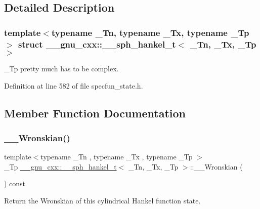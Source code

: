 \subsection{Detailed Description}
\subsubsection*{template$<$typename \+\_\+\+Tn, typename \+\_\+\+Tx, typename \+\_\+\+Tp$>$\newline
struct \+\_\+\+\_\+gnu\+\_\+cxx\+::\+\_\+\+\_\+sph\+\_\+hankel\+\_\+t$<$ \+\_\+\+Tn, \+\_\+\+Tx, \+\_\+\+Tp $>$}

\+\_\+\+Tp pretty much has to be complex. 

Definition at line 582 of file specfun\+\_\+state.\+h.



\subsection{Member Function Documentation}
\mbox{\label{struct____gnu__cxx_1_1____sph__hankel__t_a401ba4615906dfc075be66e7048da8c2}} 
\subsubsection{\texorpdfstring{\+\_\+\+\_\+\+Wronskian()}{\_\_Wronskian()}}
{\footnotesize\ttfamily template$<$typename \+\_\+\+Tn , typename \+\_\+\+Tx , typename \+\_\+\+Tp $>$ \\
\+\_\+\+Tp \hyperlink{struct____gnu__cxx_1_1____sph__hankel__t}{\+\_\+\+\_\+gnu\+\_\+cxx\+::\+\_\+\+\_\+sph\+\_\+hankel\+\_\+t}$<$ \+\_\+\+Tn, \+\_\+\+Tx, \+\_\+\+Tp $>$\+::\+\_\+\+\_\+\+Wronskian (\begin{DoxyParamCaption}{ }\end{DoxyParamCaption}) const\hspace{0.3cm}{\ttfamily [inline]}}



Return the Wronskian of this cylindrical Hankel function state. 



